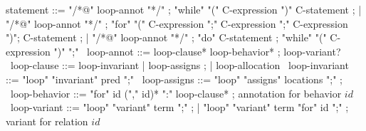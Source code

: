 \begin{syntax}
  statement ::= "/*@" loop-annot "*/" ;
  "while" "(" C-expression ")" C-statement ;
  | "/*@" loop-annot "*/" ;
  "for" "(" C-expression ";" C-expression ";" C-expression ")";
  C-statement ;
  | "/*@" loop-annot "*/" ;
  "do" C-statement ;
  "while" "(" C-expression ")" ";"
  \
  loop-annot ::= loop-clause* loop-behavior* ;
                 loop-variant?
  \
  loop-clause ::= loop-invariant | loop-assigns ;
                | loop-allocation
  \
  loop-invariant ::= "loop" "invariant" pred ";" 
  \
  loop-assigns ::= "loop" 
                   "assigns" locations ";" ;
  \
  loop-behavior ::= "for" id ("," id)* ":" loop-clause* ; annotation for behavior $id$
  \
  loop-variant ::= "loop" "variant" term ";" ;
  | "loop" "variant" term "for" id ";" ; variant for relation $id$
\end{syntax}
